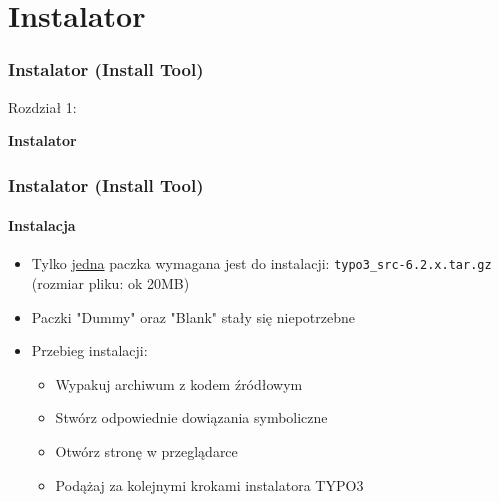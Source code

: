%
\section{Instalator}
\begin{frame}[fragile]
	\frametitle{Instalator (Install Tool)}

	\begin{center}\huge{Rozdział 1:}\end{center}
	\begin{center}\huge{\color{typo3darkgrey}\textbf{Instalator}}\end{center}

\end{frame}


\begin{frame}[fragile]
	\frametitle{Instalator (Install Tool)}
	\framesubtitle{Instalacja}

	\begin{itemize}
		\item Tylko \underline{jedna} paczka wymagana jest do instalacji:\newline
				\texttt{typo3\_src-6.2.x.tar.gz} (rozmiar pliku: ok 20MB)
		\item Paczki "Dummy" oraz "Blank" stały się niepotrzebne
		\item Przebieg instalacji:
			\begin{itemize}
				\item Wypakuj archiwum z kodem źródłowym
				\item Stwórz odpowiednie dowiązania symboliczne
				\item Otwórz stronę w przeglądarce
				\item Podążaj za kolejnymi krokami instalatora TYPO3
			\end{itemize}

	\end{itemize}

\end{frame}


